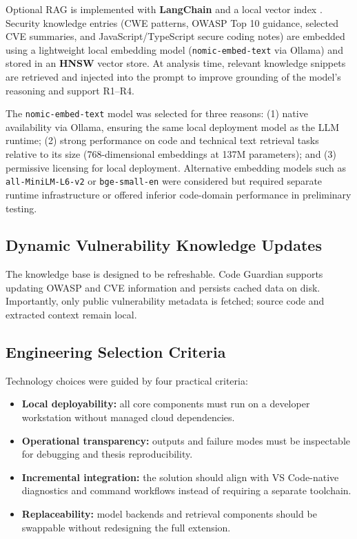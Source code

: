 Optional RAG is implemented with \textbf{LangChain} and a local vector index \cite{langchainDocs}. Security knowledge entries (CWE patterns, OWASP Top 10 guidance, selected CVE summaries, and JavaScript/TypeScript secure coding notes) are embedded using a lightweight local embedding model (\texttt{nomic-embed-text} via Ollama) and stored in an \textbf{HNSW} vector store. At analysis time, relevant knowledge snippets are retrieved and injected into the prompt to improve grounding of the model's reasoning and support R1--R4.

The \texttt{nomic-embed-text} model was selected for three reasons: (1) native availability via Ollama, ensuring the same local deployment model as the LLM runtime; (2) strong performance on code and technical text retrieval tasks relative to its size (768-dimensional embeddings at 137M parameters); and (3) permissive licensing for local deployment. Alternative embedding models such as \texttt{all-MiniLM-L6-v2} or \texttt{bge-small-en} were considered but required separate runtime infrastructure or offered inferior code-domain performance in preliminary testing.

\subsection*{Dynamic Vulnerability Knowledge Updates}

The knowledge base is designed to be refreshable. Code Guardian supports updating OWASP and CVE information and persists cached data on disk. Importantly, only public vulnerability metadata is fetched; source code and extracted context remain local.

\subsection*{Engineering Selection Criteria}

Technology choices were guided by four practical criteria:
\begin{itemize}
  \item \textbf{Local deployability:} all core components must run on a developer workstation without managed cloud dependencies.
  \item \textbf{Operational transparency:} outputs and failure modes must be inspectable for debugging and thesis reproducibility.
  \item \textbf{Incremental integration:} the solution should align with VS Code-native diagnostics and command workflows instead of requiring a separate toolchain.
  \item \textbf{Replaceability:} model backends and retrieval components should be swappable without redesigning the full extension.
\end{itemize}

